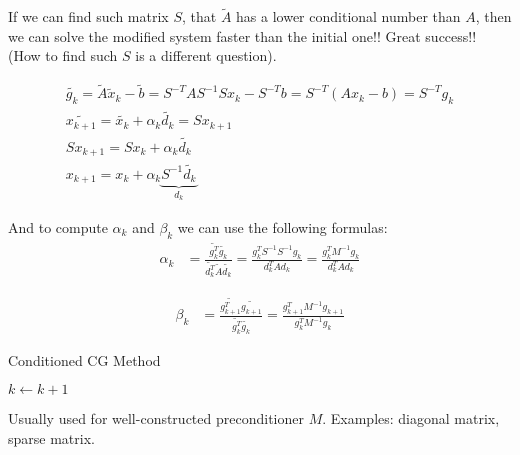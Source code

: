 If we can find such matrix $S$, that $\tilde{A}$ has a lower conditional number than $A$, then we can solve the modified system faster than the initial one!! Great success!! (How to find such $S$ is a different question).

\begin{gather*}
    \tilde{g_k} = \tilde{A} \tilde{x}_k - \tilde{b} = S^{-T} A S^{-1} S x_k - S^{-T} b = S^{-T} (A x_k - b) = S^{-T} g_k \\
    \tilde{x_{k+1}} = \tilde{x_k} + \alpha_k \tilde{d_k} = S x_{k+1} \\
    S x_{k+1} = S x_k + \alpha_k \tilde{d_k} \\
    x_{k+1} = x_k + \alpha_k \underbrace{S^{-1} \tilde{d_k}}_{d_k}
\end{gather*}

And to compute $\alpha_k$ and $\beta_k$ we can use the following formulas:
\begin{align*}
    \alpha_k &= \frac{\tilde{g_k^T}\tilde{g_k}}{\tilde{d_k^T} \tilde{A} \tilde{d_k}} = \frac{g_k^T S^{-1} S^{-1} g_k}{d_k^T A d_k} =\boxed{\frac{g_k^T M^{-1} g_k}{d_k^T A d_k}} 
\end{align*}

\begin{align*}
    \beta_k &= \frac{\tilde{g_{k+1}^T} \tilde{g_{k+1}}}{\tilde{g_k^T} \tilde{g_k}} = \boxed{\frac{g_{k+1}^T M^{-1} g_{k+1}}{g_k^T M^{-1} g_k}}
\end{align*}

\begin{algorithm}
    \caption{Conditioned CG Method}
    \begin{algorithmic}[1]
        \State $k \gets k + 1$
    \EndWhile
    \end{algorithmic}
\end{algorithm}

\notice \; Usually used for well-constructed preconditioner $M$. Examples: diagonal matrix, sparse matrix. 